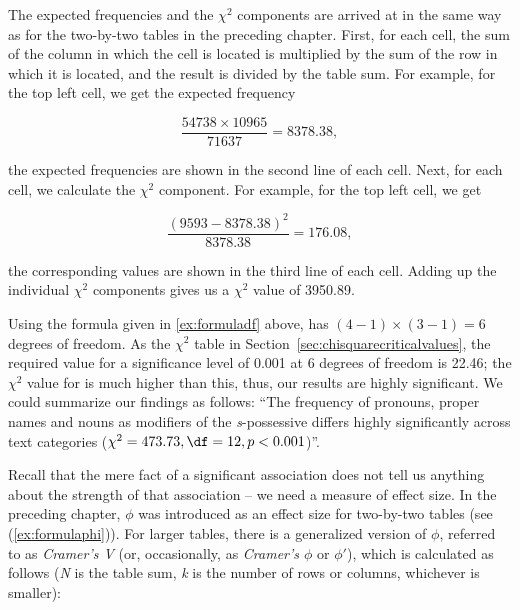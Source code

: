 The expected  frequencies and the $\chi^2$  components are arrived at in the same way as for the two\hyp{}by\hyp{}two tables in the preceding chapter. First, for each cell, the sum of the column in which the cell is located is multiplied by the sum of the row in which it is located, and the result is divided by the table sum. For example, for the top left cell, we get the expected frequency

\[\frac{54738 \times 10965}{71637} = 8378.38,\]

the expected  frequencies are shown in the second line of each cell. Next, for each cell, we calculate the $\chi^2$  component. For example, for the top left cell, we get

\[\frac{(9593 - 8378.38)^2}{8378.38} = 176.08,\]

the corresponding values are shown in the third line of each cell. Adding up the individual $\chi^2$  components gives us a $\chi^2$ value of 3950.89.

Using the formula given in \ref{ex:formuladf} above,  has $(4 - 1) \times (3 - 1) = 6$ degrees of freedom. As the $\chi^2$  table in Section~\ref{sec:chisquarecriticalvalues}, the required value for a significance  level of 0.001 at 6 degrees of freedom is 22.46; the $\chi^2$  value for  is much higher than this, thus, our results are highly significant. We could summarize our findings as follows: ``The frequency  of pronouns,  proper names and nouns  as modifiers of the \textit{s}-possessive  differs highly significantly across text categories ($\chi^2 = 473.73, \df = 12, p < 0.001$)''.

Recall that the mere fact of a significant  association does not tell us anything about the strength of that association -- we need a measure of effect size.  In the preceding chapter, $\phi$ was introduced as an effect size for two\hyp{}by\hyp{}two tables (see (\ref{ex:formulaphi})). For larger tables, there is a generalized version of $\phi$, referred to as \textit{Cramer's V} (or, occasionally, as \textit{Cramer's $\phi$} or $\phi'$), which is calculated as follows (\textit{N} is the table sum, \textit{k} is the number of rows or columns, whichever is smaller):

\begin{exe}
\ex {}
\end{exe}

